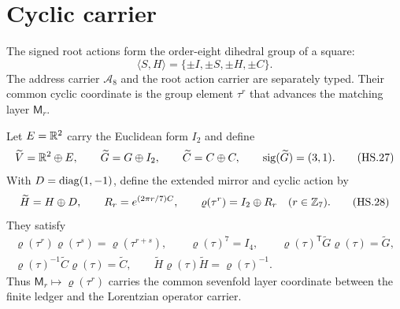 \documentclass[10pt]{article}
\begin{document}
\section{Cyclic carrier}

\sharedroot

The signed root actions form the order-eight dihedral group of a square:
\[
\langle S,H\rangle
=\{\pm I,\pm S,\pm H,\pm C\}.
\tag{HS.26}
\]
The address carrier $\mathcal A_8$ and the root action carrier are separately
typed. Their common cyclic coordinate is the group element $\tau^r$ that
advances the matching layer $\mathsf M_r$.

Let $E=\mathbb R^2$ carry the Euclidean form $I_2$ and define
\[
\widetilde V=\mathbb R^2\oplus E,
\qquad
\widetilde G=G\oplus I_2,
\qquad
\widetilde C=C\oplus C,
\qquad
\operatorname{sig}(\widetilde G)=(3,1).
\tag{HS.27}
\]
With $D=\operatorname{diag}(1,-1)$, define the extended mirror and cyclic action by
\[
\widetilde H=H\oplus D,
\qquad
R_r=e^{(2\pi r/7)C},
\qquad
\varrho(\tau^r)=I_2\oplus R_r
\quad(r\in\mathbb Z_7).
\tag{HS.28}
\]
They satisfy
\[
\begin{gathered}
\varrho(\tau^r)\varrho(\tau^s)=\varrho(\tau^{r+s}),
\qquad
\varrho(\tau)^7=I_4,
\qquad
\varrho(\tau)^{\mathsf T}\widetilde G\varrho(\tau)=\widetilde G,\\
\varrho(\tau)^{-1}\widetilde C\varrho(\tau)=\widetilde C,
\qquad
\widetilde H\varrho(\tau)\widetilde H=\varrho(\tau)^{-1}.
\end{gathered}
\tag{HS.29}
\]
Thus $\mathsf M_r\mapsto\varrho(\tau^r)$ carries the common sevenfold layer
coordinate between the finite ledger and the Lorentzian operator carrier.
\end{document}
